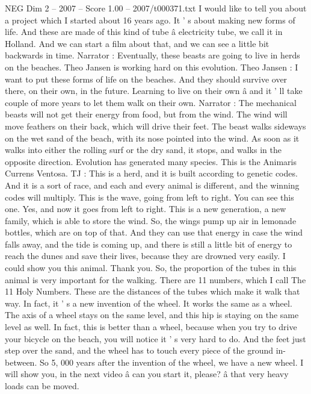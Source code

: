 \begin{textsample}{NEG Dim 2 – 2007 – Score 1.00 – 2007/t000371.txt}  \label{ex:f2_neg_009}
I would like to tell you about a project which I started about 16 years ago.
It ' s about making new forms of life.
And these are made of this kind of tube â electricity tube, we call it in Holland.
And we can start a film about that, and we can see a little bit backwards in time.
Narrator : Eventually, these beasts are going to live in herds on the beaches.
Theo Jansen is working hard on this evolution.
Theo Jansen : I want to put these forms of life on the beaches.
And they should survive over there, on their own, in the future.
Learning to live on their own â and it ' ll take couple of more years to let them walk on their own.
Narrator : The mechanical beasts will not get their energy from food, but from the wind.
The wind will move feathers on their back, which will drive their feet.
The beast walks sideways on the wet sand of the beach, with its nose pointed into the wind.
As soon as it walks into either the rolling surf or the dry sand, it stops, and walks in the opposite direction.
Evolution has generated many species.
This is the Animaris Currens Ventosa.
TJ : This is a herd, and it is built according to genetic codes.
And it is a sort of race, and each and every animal is different, and the winning codes will multiply.
This is the wave, going from left to right.
You can see this one.
Yes, and now it goes from left to right.
This is a new generation, a new family, which is able to store the wind.
So, the wings pump up air in lemonade bottles, which are on top of that.
And they can use that energy in case the wind falls away, and the tide is coming up, and there is still a little bit of energy to reach the dunes and save their lives, because they are drowned very easily.
I could show you this animal.
Thank you.
So, the proportion of the tubes in this animal is very important for the walking.
There are 11 numbers, which I call The 11 Holy Numbers.
These are the distances of the tubes which make it walk that way.
In fact, it ' s a new invention of the wheel.
It works the same as a wheel.
The axis of a wheel stays on the same level, and this hip is staying on the same level as well.
In fact, this is better than a wheel, because when you try to drive your bicycle on the beach, you will notice it ' s very hard to do.
And the feet just step over the sand, and the wheel has to touch every piece of the ground in-between.
So 5, 000 years after the invention of the wheel, we have a new wheel.
I will show you, in the next video â can you start it, please? â that very heavy loads can be moved.

\end{textsample}
